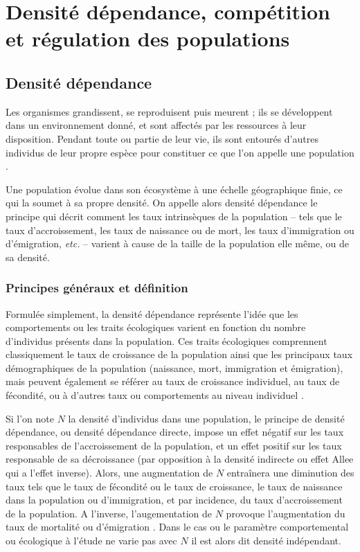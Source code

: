\section{Densité dépendance,
compétition et régulation des populations}

\subsection{Densité dépendance}

Les organismes grandissent, se reproduisent puis meurent ; ils se développent
dans un environnement donné, et sont affectés par les ressources à leur
disposition. Pendant toute ou partie de leur vie, ils sont
entourés d'autres individus de leur propre espèce pour constituer ce que l'on
appelle une population \autocites{begon2009a}. 

Une population évolue dans son écosystème à une échelle géographique finie, ce
qui la soumet à sa propre densité. On appelle alors densité
dépendance le principe qui décrit comment les taux intrinsèques de la
population -- tels que le taux d'accroissement, les taux de naissance ou de
mort, les taux d'immigration ou d'émigration, \textit{etc.} -- varient à cause
de la taille de la population elle même, ou de sa densité.

\subsubsection{Principes généraux et définition}

Formulée simplement, la densité dépendance représente l'idée que les
comportements ou les traits écologiques varient en fonction du nombre
d'individus présents dans la population. Ces traits écologiques comprennent
classiquement le taux de croissance de la population ainsi que les principaux
taux démographiques de la population (naissance, mort, immigration et
émigration), mais peuvent également se référer au taux de croissance individuel,
au taux de fécondité, ou à d'autres taux ou comportements au niveau individuel
\autocites{royama1977a}.

Si l'on note $N$ la densité d'individus dans une population, le principe de
densité dépendance, ou densité dépendance directe, impose un effet négatif
sur les taux responsables de l'accroissement de la population, et un effet
positif sur les taux responsable de sa décroissance (par opposition à la
densité indirecte ou effet Allee qui a l'effet inverse). Alors, une augmentation
de $N$ entraînera une diminution des taux tels que le taux de fécondité ou le
taux de croissance, le taux de naissance dans la population ou d'immigration, et
par incidence, du taux d'accroissement de la population. A l'inverse,
l'augementation de $N$ provoque l'augmentation du taux de mortalité ou
d'émigration \autocites{hixon2009a}. Dans le cas ou le paramètre comportemental
ou écologique à l'étude ne varie pas avec $N$ il est alors dit densité
indépendant. 

